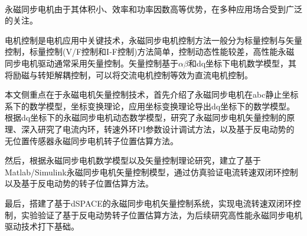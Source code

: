 \begin{abstractCn}\\

	永磁同步电机由于其体积小、效率和功率因数高等优势，在多种应用场合受到广泛的关注。
	
	电机控制是电机应用中关键技术，永磁同步电机控制方法一般分为标量控制与矢量控制，标量控制(V/F控制和I-F控制)方法简单，控制动态性能较差，高性能永磁同步电机驱动通常采用矢量控制。矢量控制基于$\alpha\beta$和dq坐标下电机数学模型，其将励磁与转矩解耦控制，可以将交流电机控制等效为直流电机控制。
	
	本文侧重点在于永磁电机矢量控制技术，首先介绍了永磁同步电机在abc静止坐标系下的数学模型，坐标变换理论，应用坐标变换理论导出dq坐标下的数学模型。根据dq坐标下的永磁同步电机动态数学模型，研究了永磁同步电机矢量控制的原理、深入研究了电流内环，转速外环PI参数设计调试方法，以及基于反电动势的无位置传感器永磁同步电机转子位置估算方法。
	
	然后，根据永磁同步电机数学模型以及矢量控制理论研究，建立了基于Matlab/Simulink永磁同步电机矢量控制模型，通过仿真验证电流转速双闭环控制以及基于反电动势的转子位置估算方法。
	
	最后，搭建了基于dSPACE的永磁同步电机矢量控制系统，实现电流转速双闭环控制，实验验证了基于反电动势转子位置估算方法，为后续研究高性能永磁同步电机驱动技术打下基础。
\\
\end{abstractCn}
